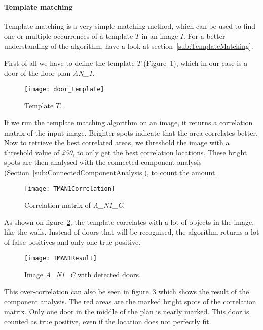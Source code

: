 \paragraph{Template matching}
\label{sub:ImpTemplateMatching}

Template matching is a very simple matching method, which can be used to find one or multiple occurrences of a template $T$ in an image $I$. For a better understanding of the algorithm, have a look at section~\ref{sub:TemplateMatching}.

First of all we have to define the template $T$ (Figure~\ref{fig:DoorTemplate}), which in our case is a door of the floor plan \textit{AN\_1}.

\begin{figure}[H]
	\centering
	\texttt{[image: door\_template]}
	\caption{Template $T$.}
	\label{fig:DoorTemplate}
\end{figure}

If we run the template matching algorithm on an image, it returns a correlation matrix of the input image. Brighter spots indicate that the area correlates better. Now to retrieve the best correlated areas, we threshold the image with a threshold value of \textit{250}, to only get the best correlation locations. These bright spots are then analysed with the connected component analysis (Section~\ref{sub:ConnectedComponentAnalysis}), to count the amount.

\begin{figure}[H]
	\centering
	\texttt{[image: TMAN1Correlation]}
	\caption{Correlation matrix of \textit{A\_N1\_C}.}
	\label{fig:TMAN1Correlation}
\end{figure}

As shown on figure~\ref{fig:TMAN1Correlation}, the template correlates with a lot of objects in the image, like the walls. Instead of doors that will be recognised, the algorithm returns a lot of false positives and only one true positive.

\begin{figure}[H]
	\centering
	\texttt{[image: TMAN1Result]}
	\caption{Image \textit{A\_N1\_C} with detected doors.}
	\label{fig:TMAN1Result}
\end{figure}

This over-correlation can also be seen in figure~\ref{fig:TMAN1Result} which shows the result of the component analysis. The red areas are the marked bright spots of the correlation matrix. Only one door in the middle of the plan is nearly marked. This door is counted as true positive, even if the location does not perfectly fit.

